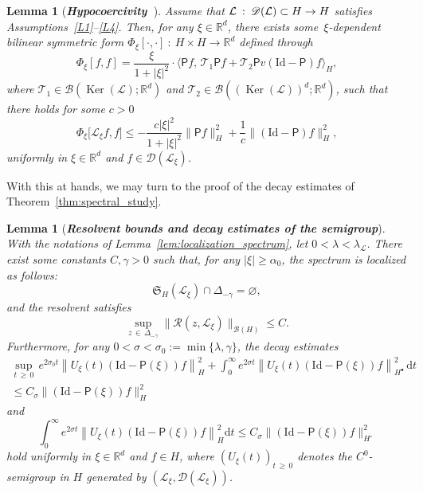 \documentclass[10pt]{amsart}
\newtheorem{lemm}[theo]{Lemma}\newtheorem{prop}[theo]{Proposition}\newtheorem{coro}[theo]{Corollary}\newtheorem{conj}[theo]{Conjecture}
\theoremstyle{definition}\newtheorem{defi}[theo]{Definition}\newtheorem{rema}[theo]{Remark}\newtheorem{exam}[theo]{Example}\newtheorem{exem}[theo]{Example}\newtheorem{nota}[theo]{Notation}
\DeclareMathOperator{\nul}{Ker}
\newcommand{\Id}{\mathrm{Id}}
\renewcommand{\d}{\mathrm{d}}
\newcommand{\R}{\mathbb{R}}
\newcommand{\fkS}{\mathfrak{S}}
\newcommand{\LL}{\mathcal{L}}
\newcommand{\PP}{\mathsf{P}}
\newcommand{\RR}{\mathcal{R}}
\newcommand{\TT}{\mathcal{T}}
\newcommand{\dom}{\mathscr{D}}
\newcommand{\BBB}{\mathscr{B}}
\newcommand{\Ss}{H}
\newcommand{\Ssp}{H^{\bullet}}
\newcommand{\Ssm}{H^{\circ}}
\renewcommand*\le{\leqslant}
\renewcommand*\ge{\geqslant}
\renewcommand*\geq{\geqslant}
\newcommand{\la}{\langle}
\newcommand{\ra}{\rangle}
\begin{document}
\begin{lemm}[\emph{\textbf{Hypocoercivity~\cite[Lemma~4.1]{D2011}}}]\label{lem:lemhypocoercivity}
Assume that $\LL\::\:\dom(\LL)\linebreak \subset \Ss \to \Ss$ satisfies Assumptions~\eqref{L1}--\eqref{L4}. Then, for any $\xi \in\R^{d}$, there exists some~$\xi$-dependent bilinear symmetric form $\Phi_\xi[\cdot, \cdot]\::\:\Ss\times \Ss \to \R^{d}$ defined through
\[
\Phi_\xi\left[f, f\right] = \frac{\xi}{1 + | \xi |^2} \cdot \Big\la \PP f, \, \TT_1 \PP f + \TT_2 \PP v \left(\Id - \PP \right) f \Big\ra_{\Ss},
\]
where $\TT_1 \in \BBB(\nul(\LL) ; \R^d )$ and $\TT_2 \in \BBB((\nul(\LL))^d ; \R^d )$, such that there holds for some $c > 0$
\begin{equation}\label{eq:hypocoercivity}
\Phi_\xi\Big[\LL_{\xi} f, f\Big] \le - \frac{ c | \xi |^2 }{1 + | \xi |^2 } \| \PP f \|^2_{\Ss} + \frac{1}{c} \| (\Id - \PP) f \|_{\Ss}^2,
\end{equation}
uniformly in $\xi \in \R^d$ and $f \in \dom(\LL_\xi)$.
\end{lemm}

With this at hands, we may turn to the proof of the decay estimates of Theorem~\ref{thm:spectral_study}.

\begin{lemm}[\emph{\textbf{Resolvent bounds and decay estimates of the semigroup}}]\label{lem:spectral_decay}
With the notations of Lemma~\ref{lem:localization_spectrum}, let $0 < \lambda < \lambda_\LL$. There exist some constants $C, \gamma > 0$ such that, for any $|\xi| \ge \alpha_{0}$, the spectrum is localized as follows:
\[
\fkS_{\Ss}(\LL_\xi) \cap \Delta_{-\gamma} = \varnothing,
\]
and the resolvent satisfies
\[
\sup_{z\,\in\,\Delta_{-\gamma}} \| \RR(z,\LL_{\xi}) \|_{\BBB(\Ss)} \le C.
\]
Furthermore, for any $0 < \sigma < \sigma_0 := \min\{\lambda, \gamma\}$, the decay estimates
\begin{multline*}
\sup_{t\,\ge\,0} \,e^{2 \sigma_0 t} \left\| U_{\xi}(t) {\left(\Id - \PP(\xi) \right)} f \right\|^2_{\Ss} + \int_0^\infty e^{2 \sigma t} \left\| U_{\xi}(t) {\left(\Id - \PP(\xi) \right)}f \right\|_{\Ssp}^2 \, \d t \\
\le C_{\sigma}\| \left(\Id - \PP(\xi) \right)f \|^2_{\Ss}
\end{multline*}
and
\[
\int_{0}^{\infty} e^{2\sigma t} \left\|U_{\xi}(t) {\left(\Id-\PP(\xi)\right)}f\right\|_{\Ss}^{2}\d t \le C_{\sigma}\|{\left(\Id-\PP(\xi)\right)}f\|_{\Ssm}^{2}
\]
hold uniformly in $\xi \in \R^{d}$ and $f \in {\Ss}$, where $(U_{\xi}(t))_{t\,\geq\,0}$ denotes the $C^{0}$-semigroup in $\Ss$ generated by $(\LL_{\xi},\dom(\LL_{\xi}))$.
\end{lemm}
\end{document}
